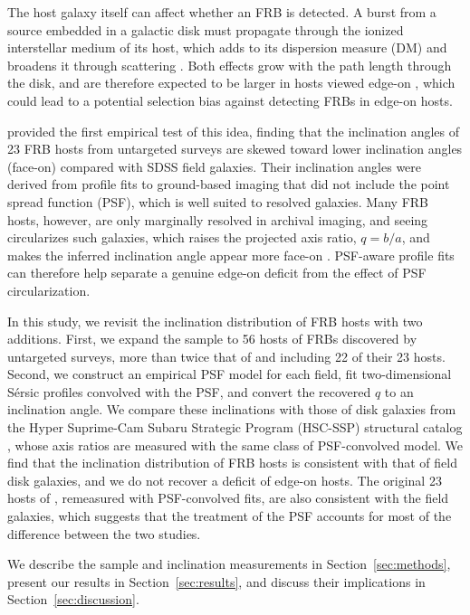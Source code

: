 \documentclass[apjl, linenumbers]{aastex701}
\begin{document}
The host galaxy itself can affect whether an FRB is detected. A burst from a source embedded in a galactic disk must propagate through the ionized interstellar medium of its host, which adds to its dispersion measure (DM) and broadens it through scattering \citep{xuHan2015, Ocker2022}. Both effects grow with the path length through the disk, and are therefore expected to be larger in hosts viewed edge-on \citep{xuHan2015, Orr2024}, which could lead to a potential selection bias against detecting FRBs in edge-on hosts. 

\citet{Bhardwaj2024} provided the first empirical test of this idea, finding that the inclination angles of 23 FRB hosts from untargeted surveys are skewed toward lower inclination angles (face-on) compared with SDSS field galaxies. Their inclination angles were derived from profile fits to ground-based imaging that did not include the point spread function (PSF), which is well suited to resolved galaxies. Many FRB hosts, however, are only marginally resolved in archival imaging, and seeing circularizes such galaxies, which raises the projected axis ratio, $q = b/a$, and makes the inferred inclination angle appear more face-on \citep{Trujillo2001}. PSF-aware profile fits can therefore help separate a genuine edge-on deficit from the effect of PSF circularization.

In this study, we revisit the inclination distribution of FRB hosts with two additions. First, we expand the sample to 56 hosts of FRBs discovered by untargeted surveys, more than twice that of \citet{Bhardwaj2024} and including 22 of their 23 hosts. Second, we construct an empirical PSF model for each field, fit two-dimensional S\'ersic profiles convolved with the PSF, and convert the recovered $q$ to an inclination angle. We compare these inclinations with those of disk galaxies from the Hyper Suprime-Cam Subaru Strategic Program (HSC-SSP) structural catalog \citep{Kawinwanichakij}, whose axis ratios are measured with the same class of PSF-convolved model. We find that the inclination distribution of FRB hosts is consistent with that of field disk galaxies, and we do not recover a deficit of edge-on hosts. The original 23 hosts of \citet{Bhardwaj2024}, remeasured with PSF-convolved fits, are also consistent with the field galaxies, which suggests that the treatment of the PSF accounts for most of the difference between the two studies.

We describe the sample and inclination measurements in Section~\ref{sec:methods}, present our results in Section~\ref{sec:results}, and discuss their implications in Section~\ref{sec:discussion}.
\end{document}
